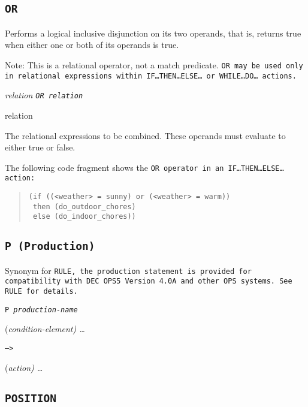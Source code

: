 {{\subsection{\tt{OR}}

Performs a logical inclusive disjunction on its two operands,
that is, returns true when either one or both of its operands
is true.

Note: This is a relational operator, not a match predicate.  \tt{OR}
may be used only in relational expressions within
\tt{IF}\ldots\tt{THEN}\ldots\tt{ELSE}\ldots{} or
\tt{WHILE}\ldots\tt{DO}\ldots{} actions.

\Format

\it{relation} \tt{OR} \it{relation}

\begin{operands}
\item[relation]

  The relational expressions to be combined. These operands must
  evaluate to either true or false.
\end{operands}

\Example

The following code fragment shows the \tt{OR} operator in an
\tt{IF}\ldots\tt{THEN}\ldots\tt{ELSE}\ldots{} action:
\begin{quote}
\begin{verbatim}
(if ((<weather> = sunny) or (<weather> = warm))
 then (do_outdoor_chores)
 else (do_indoor_chores))
\end{verbatim}
\end{quote}

\subsection{\tt{P} (Production)}

Synonym for \tt{RULE}, the production statement is provided for
compatibility with DEC OPS5 Version 4.0A and other OPS
systems. See \tt{RULE} for details.

\Format

\tt{P} \it{production-name} 

\qquad(\it{condition-element}) \dots

\qquad\tt{-->}

\qquad(\it{action}) \ldots

\subsection{\tt{POSITION}}

}}
